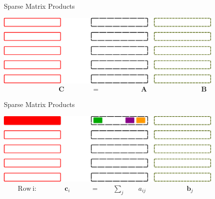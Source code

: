 


\begin{frame}{Sparse Matrix Products}

\begin{center}
 \includegraphics[width=0.85\textwidth]{figures/spgemm-matrix-1} \\
 \begin{align*}
  \qquad \mathbf{C} \qquad \qquad = \qquad \qquad \qquad \mathbf{A} \qquad \qquad \qquad \qquad \mathbf{B}
 \end{align*}
 \vspace*{-0.22cm}
\end{center}

\end{frame}


\begin{frame}{Sparse Matrix Products}

\begin{center}
 \includegraphics[width=0.85\textwidth]{figures/spgemm-matrix-2} \\
 \begin{align*}
  \mathrm{Row\ i:} \qquad \qquad \mathbf{c}_i \qquad \quad =\qquad \sum_{j} \qquad a_{ij} \qquad \qquad \qquad \mathbf{b}_j \qquad \qquad \qquad
 \end{align*}
\end{center}


\end{frame}

